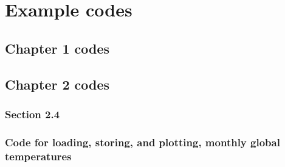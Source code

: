\documentclass{tufte-book} %
\begin{document}
%

\chapter{Example codes}
\label{ch:11}


\newpage


\section{Chapter 1 codes}


\newpage


\section{Chapter 2 codes}


\subsection*{\textbf{Section 2.4}}

\subsection*{Code for loading, storing, and plotting, monthly global temperatures}
\end{document}
